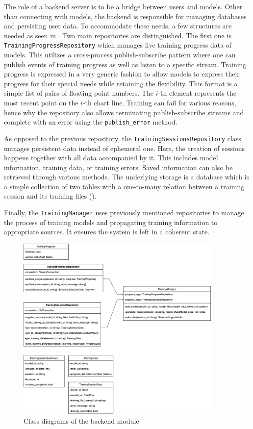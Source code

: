 \documentclass[a4paper, 11pt, twoside]{report}
\theoremstyle{definition}
\begin{document}
The role of a backend server is to be a bridge between users and models. Other than connecting with models, the backend is responsible for managing databases and persisting user data. To accommodate these needs, a few structures are needed as seen in . Two main repositories are distinguished. The first one is \texttt{TrainingProgressRepository} which manages live training progress data of models. This utilizes a cross-process publish-subscribe pattern where one can publish events of training progress as well as listen to a specific stream. Training progress is expressed in a very generic fashion to allow models to express their progress for their special needs while retaining the flexibility. This format is a simple list of pairs of floating point numbers. The $i$-th element represents the most recent point on the $i$-th chart line. Training can fail for various reasons, hence why the repository also allows terminating publish-subscribe streams and complete with an error using the \texttt{publish\_error} method. \par
As opposed to the previous repository, the \texttt{TrainingSessionsRepository} class manages persistent data instead of ephemeral one. Here, the creation of sessions happens together with all data accompanied by it. This includes model information, training data, or training errors. Saved information can also be retrieved through various methods. The underlying storage is a database which is a simple collection of two tables with a one-to-many relation between a training session and its training files (). \par
Finally, the \texttt{TrainingManager} uses previously mentioned repositories to manage the process of training models and propagating training information to appropriate sources. It ensures the system is left in a coherent state. \par

\begin{figure}
    \centering
    \includegraphics[width=0.9\textwidth]{backend_class.png}
    \caption{Class diagrams of the backend module}
    \label{fig:backend_class_diagram}
\end{figure}
\end{document}

